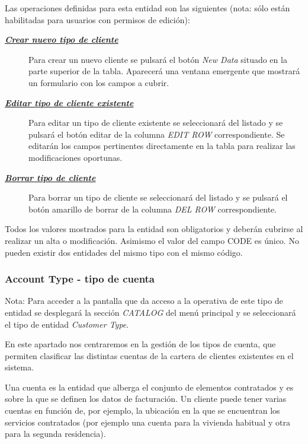 Las operaciones definidas para esta entidad son las siguientes (nota: sólo están habilitadas para usuarios con permisos de edición):
\begin{description}
\item[\underline{\textsl{\textbf{Crear nuevo tipo de cliente}}}] Para crear un nuevo cliente se pulsará el botón \textit{New Data} situado en la parte superior de la tabla. Aparecerá una ventana emergente que mostrará un formulario con los campos a cubrir.

\item[\underline{\textsl{\textbf{Editar tipo de cliente existente}}}] Para editar un tipo de cliente existente se seleccionará del listado y se pulsará el botón editar de la columna \textit{EDIT ROW} correspondiente. Se editarán los campos pertinentes directamente en la tabla para realizar las modificaciones oportunas. 

\item[\underline{\textsl{\textbf{Borrar tipo de cliente}}}] Para borrar un tipo de cliente se seleccionará del listado y se pulsará el botón amarillo de borrar de la columna \textit{DEL ROW} correspondiente.
\end{description}

Todos los valores mostrados para la entidad son obligatorios y deberán cubrirse al realizar un alta o modificación. Asimismo el valor del campo CODE es único. No pueden existir dos entidades del mismo tipo con el mismo código.




\subsubsection{Account Type - tipo de cuenta}
\label{sub:account-type}

Nota: Para acceder a la pantalla que da acceso a la operativa de este tipo de entidad se desplegará la sección \emph{CATALOG} del menú principal y se seleccionará el tipo de entidad \emph{Customer Type}.

En este apartado nos centraremos en la gestión de los tipos de cuenta, que permiten clasificar las distintas cuentas de la cartera de clientes existentes en el sistema.

Una cuenta es la entidad que alberga el conjunto de elementos contratados y es sobre la que se definen los datos de facturación. Un cliente puede tener varias cuentas en función de, por ejemplo, la ubicación en la que se encuentran los servicios contratados (por ejemplo una cuenta para la vivienda habitual y otra para la segunda residencia). 


